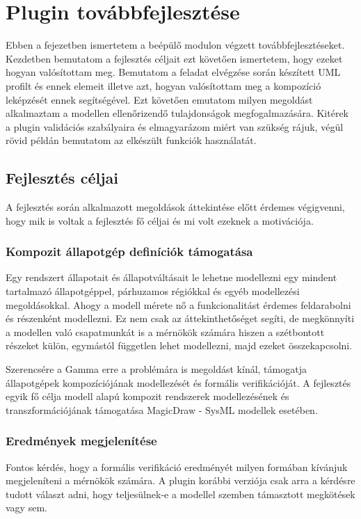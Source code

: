 \chapter{Plugin továbbfejlesztése}

Ebben a fejezetben ismertetem a beépülő modulon végzett továbbfejlesztéseket. Kezdetben bemutatom a fejlesztés céljait ezt követően ismertetem, hogy ezeket hogyan valósítottam meg. Bemutatom a feladat elvégzése során készített UML profilt és ennek elemeit illetve azt, hogyan valósítottam meg a kompozíció leképzését ennek segítségével. Ezt követően emutatom milyen megoldást alkalmaztam a modellen ellenőrizendő tulajdonságok megfogalmazására. Kitérek a plugin validációs szabályaira és elmagyarázom miért van szükség rájuk, végül rövid példán bemutatom az elkészült funkciók használatát.

\section{Fejlesztés céljai}

A fejlesztés során alkalmazott megoldások áttekintése előtt érdemes végigvenni, hogy mik is voltak a fejlesztés fő céljai és mi volt ezeknek a motivációja.

\subsection{Kompozit állapotgép definíciók támogatása}
Egy rendszert állapotait és állapotváltásait le lehetne modellezni egy mindent tartalmazó állapotgéppel, párhuzamos régiókkal és egyéb modellezési megoldásokkal. Ahogy a modell mérete nő a funkcionalitást érdemes feldarabolni és részenként modellezni. Ez nem csak az áttekinthetőséget segíti, de megkönnyíti a modellen való csapatmunkát is a mérnökök számára hiszen a szétbontott részeket külön, egymástól független lehet modellezni, majd ezeket összekapcsolni.

Szerencsére a Gamma erre a problémára is megoldást kínál, támogatja állapotgépek kompozíciójának modellezését és formális verifikációját. A fejlesztés egyik fő célja modell alapú kompozit rendszerek modellezésének és transzformációjának támogatása MagicDraw - SysML modellek esetében.

\subsection{Eredmények megjelenítése}
Fontos kérdés, hogy a formális verifikáció eredményét milyen formában kívánjuk megjeleníteni a mérnökök számára. A plugin korábbi verziója csak arra a kérdésre tudott választ adni, hogy teljesülnek-e a modellel szemben támasztott megkötések vagy sem.

